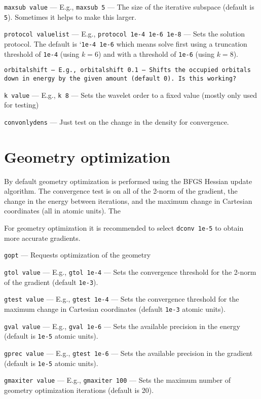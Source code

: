 \documentclass[letterpaper]{book}
\begin{document}
{\tt maxsub value} --- E.g., {\tt maxsub 5} --- The size of the iterative subspace (default is {\tt 5}).  Sometimes it helps to make this larger.

{\tt protocol valuelist} --- E.g., {\tt protocol 1e-4 1e-6 1e-8} --- Sets the solution protocol.  The default is `{\tt 1e-4 1e-6} which means solve first using a truncation threshold of {\tt 1e-4} (using $k=6$) and with a threshold of {\tt 1e-6} (using $k=8$).

{\tt orbitalshift --- E.g., {\tt orbitalshift 0.1} --- Shifts the occupied orbitals down in energy by the given amount (default {\tt 0}).  Is this working?

{\tt k value} --- E.g., {\tt k 8} --- Sets the wavelet order to a fixed value (mostly only used for testing)

{\tt convonlydens} --- Just test on the change in the density for convergence.


\section{Geometry optimization}

By default geometry optimization is performed using the BFGS Hessian update algorithm.  The convergence test is on all of the 2-norm of the gradient, the change in the energy between iterations, and the maximum change in Cartesian coordinates (all in atomic units).  The 

For geometry optimization it is recommended to select {\tt dconv 1e-5} to obtain more accurate gradients.

{\tt gopt} --- Requests optimization of the geometry

{\tt gtol value} --- E.g., {\tt gtol 1e-4} --- Sets the convergence threshold for the 2-norm of the gradient (default {\tt 1e-3}).

{\tt gtest value} --- E.g., {\tt gtest 1e-4} --- Sets the convergence threshold for the maximum change in Cartesian coordinates (default {\tt 1e-3} atomic units).

{\tt gval value} --- E.g., {\tt gval 1e-6} --- Sets the available precision in the energy (default is {\tt 1e-5} atomic units).

{\tt gprec value} --- E.g., {\tt gtest 1e-6} --- Sets the available precision in the gradient (default is {\tt 1e-5} atomic units).

{\tt gmaxiter value} --- E.g., {\tt gmaxiter 100} --- Sets the maximum number of geometry optimization iterations (default is 20).

}
\end{document}
